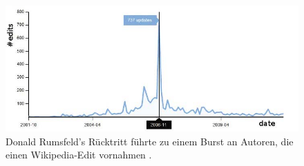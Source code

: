 \begin{figure}[h]
    \includegraphics[width=.5\textwidth]{images/Extracting_EventRelated_Information_from_Article.jpg}
    \caption{Donald Rumsfeld’s Rücktritt führte zu einem Burst an Autoren, die einen Wikipedia-Edit vornahmen \cite{10.1007978-3-642-36973-5_22}.}
    \label{fig:donald_rumsfelds_resignation_burst}
\end{figure}